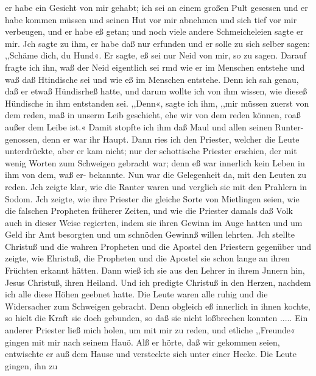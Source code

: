 er habe ein Gesicht von mir gehabt; ich sei an einem großen Pult
gesessen und er habe kommen müssen und seinen Hut vor mir
abnehmen und sich tief vor mir verbeugen, und er habe eß getan;
und noch viele andere Schmeicheleien sagte er mir. Jch sagte
zu ihm, er habe daß nur erfunden und er solle zu sich selber
sagen: ,,Schäme dich, du Hund«. Er sagte, eß sei nur Neid von
mir, so zu sagen. Darauf fragte ich ihn, waß der Neid eigentlich
sei rmd wie er im Menschen entstehe und waß daß Htindische sei
und wie eß im Menschen entstehe. Denn ich sah genau, daß er
etwaß Hündisrheß hatte, und darum wollte ich von ihm wissen,
wie dieseß Hündische in ihm entstanden sei. ,,Denn«, sagte ich
ihm, ,,mir müssen zuerst von dem reden, maß in unserm Leib
geschieht, ehe wir von dem reden können, roaß außer dem Leibe
ist.« Damit stopfte ich ihm daß Maul und allen seinen Runter-
genossen, denn er war ihr Haupt. Dann ries ich den Priester,
welcher die Leute unterdrückte, aber er kam nicht; nur der schottische
Priester erschien, der mit wenig Worten zum Schweigen gebracht
war; denn eß war innerlich kein Leben in ihm von dem, waß er-
bekannte. Nun war die Gelegenheit da, mit den Leuten zu reden.
Jch zeigte klar, wie die Ranter waren und verglich sie mit den
Prahlern in Sodom. Jch zeigte, wie ihre Priester die gleiche
Sorte von Mietlingen seien, wie die falschen Propheten früherer
Zeiten, und wie die Priester damals daß Volk auch in dieser
Weise regierten, indem sie ihren Gewinn im Auge hatten und
um Geld ihr Amt besorgten und um schnöden Gewinnß willen
lehrten. Jch stellte Christuß und die wahren Propheten und die
Apostel den Priestern gegenüber und zeigte, wie Ehristuß, die
Propheten und die Apostel sie schon lange an ihren Früchten
erkannt hätten. Dann wieß ich sie aus den Lehrer in ihrem
Jnnern hin, Jesus Christuß, ihren Heiland. Und ich predigte
Christuß in den Herzen, nachdem ich alle diese Höhen geebnet
hatte. Die Leute waren alle ruhig und die Widersacher zum
Schweigen gebracht. Denn obgleich eß innerlich in ihnen kochte,
so hielt die Kraft sie doch gebunden, so daß sie nicht loßbrechen
konnten .....
Ein anderer Priester ließ mich holen, um mit mir zu reden,
und etliche ,,Freunde« gingen mit mir nach seinem Hauö. Alß
er hörte, daß wir gekommen seien, entwischte er auß dem Hause
und versteckte sich unter einer Hecke. Die Leute gingen, ihn zu


